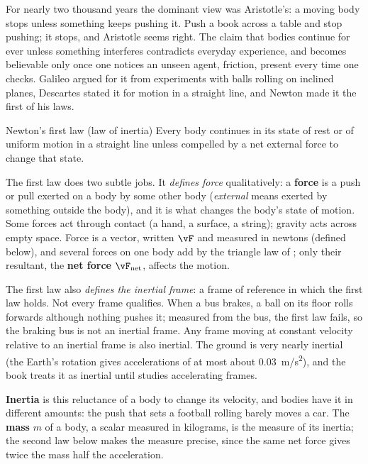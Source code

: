 For nearly two thousand years the dominant view was Aristotle's: a moving body stops unless something
keeps pushing it. Push a book across a table and stop pushing; it stops, and Aristotle seems right. The
claim that bodies continue for ever unless something interferes contradicts everyday experience, and
becomes believable only once one notices an unseen agent, friction, present every time one checks. Galileo argued for it from experiments with balls rolling on inclined
planes, Descartes stated it for motion in a straight line, and Newton made it the first of his laws.

\begin{keybox}{Newton's first law (law of inertia)}
Every body continues in its state of rest or of uniform motion in a straight line unless compelled by a
net external force to change that state.
\end{keybox}

The first law does two subtle jobs. It \emph{defines force} qualitatively: a \textbf{force} is a push
or pull exerted on a body by some other body (\emph{external} means exerted by something outside the
body), and it is what changes the body's state of motion. Some forces act through contact (a hand, a
surface, a string); gravity acts across empty space. Force is a vector, written $\vF$ and measured in
newtons (defined below), and several forces on one body add by the triangle law of ;
only their resultant, the \textbf{net force} $\vF_{\text{net}}$, affects the motion.

The first law also \emph{defines the inertial frame}: a frame of reference in which the first law holds.
Not every frame qualifies. When a bus brakes, a ball on its floor rolls forwards although nothing pushes
it; measured from the bus, the first law fails, so the braking bus is not an inertial frame. Any frame
moving at constant velocity relative to an inertial frame is also inertial. The ground is very nearly
inertial (the Earth's rotation gives accelerations of at most about \SI{0.03}{m/s^2}), and the book
treats it as inertial until  studies accelerating frames.

\textbf{Inertia} is this reluctance of a body to change its velocity, and bodies have it in different
amounts: the push that sets a football rolling barely moves a car. The \textbf{mass} $m$ of a body, a
scalar measured in kilograms, is the measure of its inertia; the second law below makes the measure
precise, since the same net force gives twice the mass half the acceleration.

